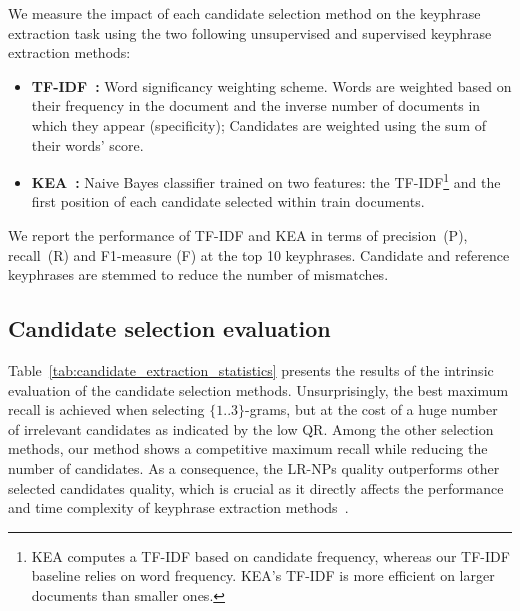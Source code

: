        We measure the impact of each candidate selection method on the keyphrase extraction task using the two following unsupervised and supervised keyphrase extraction methods:
        \begin{itemize}
            \item{\textbf{TF-IDF~\cite{jones1972tfidf}:} Word significancy weighting scheme.
                  Words are weighted based on their frequency in the document and the inverse number of documents in which they appear (specificity);
                  Candidates are weighted using the sum of  their words' score.}
            \item{\textbf{KEA~\cite{witten1999kea}:} Naive Bayes classifier trained on two features: the TF-IDF\footnote{KEA computes a TF-IDF based on candidate frequency, whereas our TF-IDF baseline relies on word frequency. KEA's TF-IDF is more efficient on larger documents than smaller ones.} and the first position of each candidate selected within train documents.}
        \end{itemize}
        We report the performance of TF-IDF and KEA in terms of precision~(P), 
        recall~(R) and F1-measure (F) at the top 10 keyphrases.
        Candidate and reference keyphrases are stemmed to reduce the number 
        of mismatches.
    
    \subsection{Candidate selection evaluation}
    \label{subsec:candidate_extraction_evaluation}
        Table~\ref{tab:candidate_extraction_statistics} presents the results of the intrinsic evaluation of the candidate selection methods.
        Unsurprisingly, the best maximum recall is achieved when selecting $\{1..3\}$-grams, but at the cost of a huge number of irrelevant candidates as indicated by the low QR.
        Among the other selection methods, our method shows a competitive maximum recall while reducing the number of candidates.
        As a consequence, the LR-NPs quality outperforms other selected candidates quality, which is crucial as it directly affects the performance and time complexity of keyphrase extraction methods~\cite{wang2014keyphraseextractionpreprocessing}.
        
    
